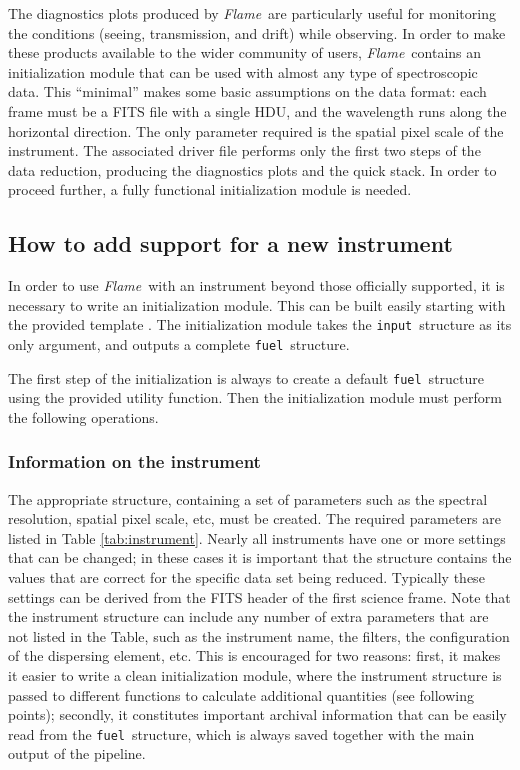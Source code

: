 \documentclass[a4paper]{article}
\newcommand{\flame}{\emph{Flame}}
\newcommand{\fuel}{\texttt{fuel}}
\newcommand{\inp}{\texttt{input}}
\begin{document}
\begin{sloppypar}
The diagnostics plots produced by \flame\ are particularly useful for monitoring the conditions (seeing, transmission, and drift) while observing. In order to make these products available to the wider community of users, \flame\ contains an initialization module that can be used with almost any type of spectroscopic data. This ``minimal'' makes some basic assumptions on the data format: each frame must be a FITS file with a single HDU, and the wavelength runs along the horizontal direction. The only parameter required is the spatial pixel scale of the instrument. The associated driver file  performs only the first two steps of the data reduction, producing the diagnostics plots and the quick stack. In order to proceed further, a fully functional initialization module is needed.

\subsection{How to add support for a new instrument}

In order to use \flame\ with an instrument beyond those officially supported, it is necessary to write an initialization module. This can be built easily starting with the provided template . The initialization module takes the \inp\ structure as its only argument, and outputs a complete \fuel\ structure.

The first step of the initialization is always to create a default \fuel\ structure using the provided utility function. Then the initialization module must perform the following operations.

\subsubsection{Information on the instrument}

The appropriate  structure, containing a set of parameters such as the spectral resolution, spatial pixel scale, etc, must be created. The required parameters are listed in Table \ref{tab:instrument}. Nearly all instruments have one or more settings that can be changed; in these cases it is important that the  structure contains the values that are correct for the specific data set being reduced. Typically these settings can be derived from the FITS header of the first science frame. Note that the instrument structure can include any number of extra parameters that are not listed in the Table, such as the instrument name, the filters, the configuration of the dispersing element, etc. This is encouraged for two reasons: first, it makes it easier to write a clean initialization module, where the instrument structure is passed to different functions to calculate additional quantities (see following points); secondly, it constitutes important archival information that can be easily read from the \fuel\ structure, which is always saved together with the main output of the pipeline.



\end{sloppypar}
\end{document}
